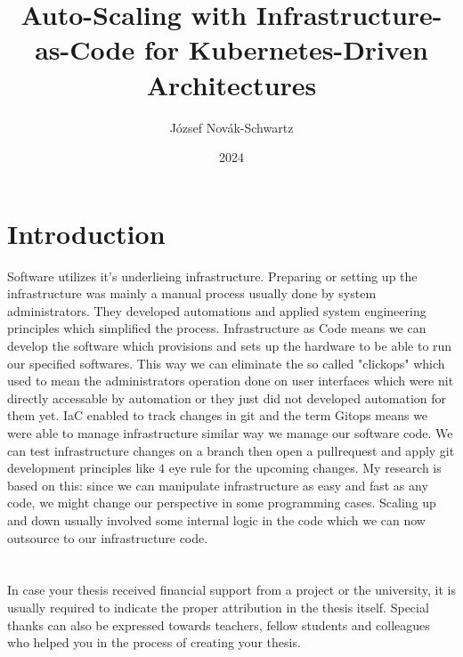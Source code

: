 \documentclass[
]{elteikthesis}[2024/04/10]
\title{Auto-Scaling with Infrastructure-as-Code for Kubernetes-Driven Architectures} %
\date{2024} %
\author{József Novák-Schwartz}
\affiliation{Associate Professor} %
\begin{document}


\maketitle


\tableofcontents
\cleardoublepage

\chapter{Introduction}
\label{ch:intro}

Software utilizes it's underlieing infrastructure. Preparing or setting up the infrastructure was mainly a manual process usually done by system administrators. They developed automations and applied system engineering principles which simplified the process. Infrastructure as Code means we can develop the software which provisions and sets up the hardware to be able to run our specified softwares. This way we can eliminate the so called "clickops" which used to mean the administrators operation done on user interfaces which were nit directly accessable by automation or they just did not developed automation for them yet. IaC enabled to track changes in git and the term Gitops means we were able to manage infrastructure similar way we manage our software code. We can test infrastructure changes on a branch then open a pullrequest and apply git development principles like 4 eye rule for the upcoming changes.
My research is based on this: since we can manipulate infrastructure as easy and fast as any code, we might change our perspective in some programming cases. Scaling up and down usually involved some internal logic in the code which we can now outsource to our infrastructure code.


\cleardoublepage


\chapter*{\acklabel}
In case your thesis received financial support from a project or the university, it is usually required to indicate the proper attribution in the thesis itself. Special thanks can also be expressed towards teachers, fellow students and colleagues who helped you in the process of creating your thesis.
\end{document}
